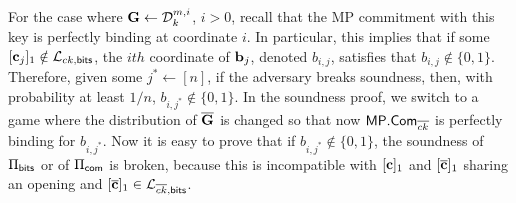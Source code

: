 For the case where $\mathbf{{G}} \gets \mathcal{D}_k^{m,i}$, $i>0$, 
recall that the MP commitment with this key is 
perfectly binding at coordinate $i$. In particular, this implies that if some $[\mathbf{c}_j]_1 \notin \mathcal{L}_{ck,\mathsf{bits}}$, the $ith$ coordinate of $\mathbf{b}_j$, denoted $b_{i,j}$, satisfies that $b_{i,j} \notin \{0,1\}$. Therefore, given some $j^* \gets [n]$, if the adversary breaks soundness, then, with probability at least $1/n$, $b_{i,j^*} \notin \{0,1\}$. In the soundness proof, we switch to a game where the distribution of $\overline{\mathbf{{G}}}$ is changed so that now 
$\mathsf{MP}.\mathsf{Com}_{\overline{ck}}$ is perfectly binding for $b_{i,j^*}$. Now it is easy to prove that if $b_{i,j^*} \notin \{0,1\}$, the soundness of $\Pi_{\mathsf{bits}}$ or of $\Pi_{\mathsf{com}}$ is broken, because this is incompatible with $[\mathbf{c}]_1$ and $[{\overline{\mathbf{c}}}]_1$ sharing an opening and $[{\overline{\mathbf{c}}}]_1 \in\mathcal{L}_{\overline{ck},\mathsf{bits}}$.

